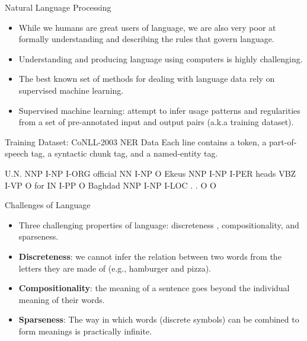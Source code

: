 \documentclass[handout]{beamer}
\begin{document}
\begin{frame}{Natural Language Processing}
\begin{scriptsize}
\begin{itemize}

\item While we humans are great users of language, we are also very poor at formally understanding and describing the rules that govern  language.

\item  Understanding and producing language using computers is highly challenging.
\item The best known set of methods for dealing with language data rely on supervised machine learning.
\item Supervised machine learning: attempt to infer usage patterns and regularities from a set of pre-annotated input and output pairs (a.k.a training dataset).

\end{itemize}
\end{scriptsize}
\end{frame}


\begin{frame}[fragile]{Training Dataset: CoNLL-2003 NER Data}
Each line contains a token, a part-of-speech tag, a syntactic chunk tag, and a named-entity tag.
\begin{center}
\begin{semiverbatim}
U.N.         NNP  I-NP  I-ORG 
official     NN   I-NP  O
Ekeus        NNP  I-NP  I-PER
heads        VBZ  I-VP  O
for          IN   I-PP  O
Baghdad      NNP  I-NP  I-LOC
.            .    O     O
\end{semiverbatim}
\end{center}


\end{frame}


\begin{frame}{Challenges of Language}
\begin{scriptsize}
\begin{itemize}
\item Three challenging properties of language: discreteness , compositionality, and sparseness.
\item \textbf{Discreteness}: we cannot infer the relation between two words from the letters they are made of (e.g., hamburger and pizza). 
\item \textbf{Compositionality}: the meaning of a sentence goes beyond the individual meaning of their words. 
\item \textbf{Sparseness}: The way in which words
(discrete symbols) can be combined to form meanings is practically infinite.
\end{itemize}
\end{scriptsize}
\end{frame}
\end{document}
